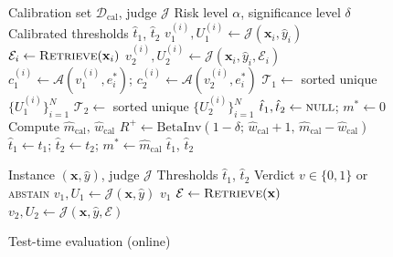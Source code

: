 \begin{figure}[t]
\begin{minipage}[t]{0.52\textwidth}
\begin{algorithm}[H]
\small
\caption{Calibration (offline)}
\label{alg:calibration}
\begin{algorithmic}[1]
\Require Calibration set $\mathcal{D}_{\mathrm{cal}}$, judge $\mathcal{J}$
\Require Risk level $\alpha$, significance level $\delta$
\Ensure Calibrated thresholds $\hat{t}_1$, $\hat{t}_2$
\Statex
{}
    \State $v_1^{(i)}, U_1^{(i)} \gets \mathcal{J}(\mathbf{x}_i, \hat{y}_i)$
    \State $\mathcal{E}_i \gets \textsc{Retrieve}(\mathbf{x}_i)$
    \State $v_2^{(i)}, U_2^{(i)} \gets \mathcal{J}(\mathbf{x}_i, \hat{y}_i, \mathcal{E}_i)$
    \State $c_1^{(i)} \!\gets\! \mathcal{A}(v_1^{(i)}, e_i^*)$;\; $c_2^{(i)} \!\gets\! \mathcal{A}(v_2^{(i)}, e_i^*)$
\EndFor
\Statex
\State $\mathcal{T}_1 \gets$ sorted unique $\{U_1^{(i)}\}_{i=1}^{N}$
\State $\mathcal{T}_2 \gets$ sorted unique $\{U_2^{(i)}\}_{i=1}^{N}$
\State $\hat{t}_1, \hat{t}_2 \gets \textsc{null}$;\; $m^* \gets 0$
        \State Compute $\hat{m}_{\mathrm{cal}},\, \hat{w}_{\mathrm{cal}}$
        \State $R^+ \!\gets\! \mathrm{BetaInv}(1\!-\!\delta;\, \hat{w}_{\mathrm{cal}}\!+\!1,\, \hat{m}_{\mathrm{cal}}\!-\!\hat{w}_{\mathrm{cal}})$
            \State $\hat{t}_1 \!\gets\! t_1$; $\hat{t}_2 \!\gets\! t_2$; $m^* \!\gets\! \hat{m}_{\mathrm{cal}}$
        \EndIf
    \EndFor
\EndFor
\State \Return $\hat{t}_1$, $\hat{t}_2$
\end{algorithmic}
\end{algorithm}
\end{minipage}%
\hfill
\begin{minipage}[t]{0.45\textwidth}
\begin{algorithm}[H]
\small
\caption{Test-time evaluation (online)}
\label{alg:test}
\begin{algorithmic}[1]
\Require Instance $(\mathbf{x}, \hat{y})$, judge $\mathcal{J}$
\Require Thresholds $\hat{t}_1$, $\hat{t}_2$
\Ensure Verdict $v \in \{0, 1\}$ or \textsc{abstain}
\Statex
\State $v_1, U_1 \gets \mathcal{J}(\mathbf{x}, \hat{y})$
    \State \Return $v_1$ 
\EndIf
\Statex
\State $\mathcal{E} \gets \textsc{Retrieve}(\mathbf{x})$
\State $v_2, U_2 \gets \mathcal{J}(\mathbf{x}, \hat{y}, \mathcal{E})$

\end{algorithmic}
\end{algorithm}
\end{minipage}
\end{figure}
